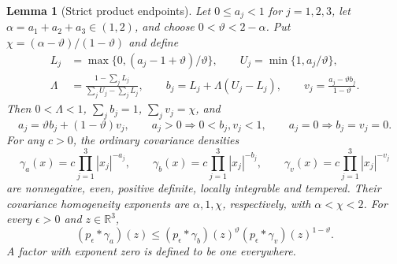 \documentclass[12pt]{article}
\numberwithin{equation}{section}
\newtheorem{lemma}[theorem]{Lemma}
\theoremstyle{definition}
\newcommand{\R}{\mathbb{R}}
\begin{document}
\begin{lemma}[Strict product endpoints]\label{L:product-endpoints}
  Let $0\le a_j<1$ for $j=1,2,3$, let
  $\alpha=a_1+a_2+a_3\in(1,2)$, and choose $0<\vartheta<2-\alpha$.
  Put $\chi=(\alpha-\vartheta)/(1-\vartheta)$ and define
  \begin{equation}\label{E:product-endpoint-vectors}
    \begin{split}
      L_j&=\max\{0,(a_j-1+\vartheta)/\vartheta\},\qquad
      U_j=\min\{1,a_j/\vartheta\},\\
      \Lambda&=\frac{1-\sum_jL_j}{\sum_jU_j-\sum_jL_j},\qquad
      b_j=L_j+\Lambda(U_j-L_j),\qquad
      v_j=\frac{a_j-\vartheta b_j}{1-\vartheta}.
    \end{split}
  \end{equation}
  Then $0<\Lambda<1$, $\sum_j b_j=1$, $\sum_jv_j=\chi$, and
  \[
    a_j=\vartheta b_j+(1-\vartheta)v_j,\qquad
    a_j>0\Longrightarrow 0<b_j,v_j<1,\qquad
    a_j=0\Longrightarrow b_j=v_j=0.
  \]
  For any $c>0$, the ordinary covariance densities
  \[
    \gamma_a(x)=c\prod_{j=1}^3|x_j|^{-a_j},\qquad
    \gamma_b(x)=c\prod_{j=1}^3|x_j|^{-b_j},\qquad
    \gamma_v(x)=c\prod_{j=1}^3|x_j|^{-v_j}
  \]
  are nonnegative, even, positive definite, locally integrable and
  tempered. Their covariance homogeneity exponents are $\alpha,1,\chi$,
  respectively, with $\alpha<\chi<2$. For every $\epsilon>0$ and
  $z\in\R^3$,
  \begin{equation}\label{E:product-gaussian-comparison}
    (p_\epsilon*\gamma_a)(z)
    \le(p_\epsilon*\gamma_b)(z)^\vartheta
    (p_\epsilon*\gamma_v)(z)^{1-\vartheta}.
  \end{equation}
  A factor with exponent zero is defined to be one everywhere.
\end{lemma}
\end{document}
